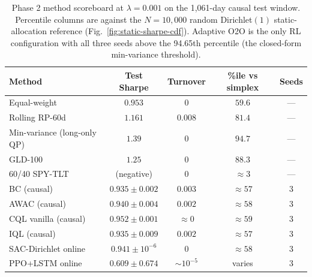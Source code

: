 \begin{table}[h]
\centering
\caption{Phase 2 method scoreboard at $\lambda{=}0.001$ on the 1{,}061-day causal test window. Percentile columns are against the $N{=}10{,}000$ random Dirichlet$(1)$ static-allocation reference (Fig.~\ref{fig:static-sharpe-cdf}). Adaptive O2O is the only RL configuration with all three seeds above the 94.65th percentile (the closed-form min-variance threshold).}
\label{tab:scoreboard}
\small
\begin{tabular}{lcccc}
\toprule
Method & Test Sharpe & Turnover & \%ile vs simplex & Seeds \\
\midrule
Equal-weight                  & $0.953$                    & $0$                                   & $59.6$                       & ---           \\
Rolling RP-60d                & $1.161$                    & $0.008$                               & $81.4$                       & ---           \\
Min-variance (long-only QP)   & $1.39$                     & $0$                                   & $94.7$                       & ---           \\
GLD-100                       & $1.25$                     & $0$                                   & $88.3$                       & ---           \\
60/40 SPY-TLT                 & (negative)                 & $0$                                   & $\approx 3$                  & ---           \\
\midrule
BC (causal)                   & $0.935 \pm 0.002$          & $0.003$                               & $\approx 57$                 & 3             \\
AWAC (causal)                 & $0.940 \pm 0.004$          & $0.002$                               & $\approx 58$                 & 3             \\
CQL vanilla (causal)          & $0.952 \pm 0.001$          & $\approx 0$                           & $\approx 59$                 & 3             \\
IQL (causal)                  & $0.935 \pm 0.009$          & $0.002$                               & $\approx 57$                 & 3             \\
\midrule
SAC-Dirichlet online          & $0.941 \pm 10^{-6}$        & $0$                                   & $\approx 58$                 & 3             \\
PPO+LSTM online               & $0.609 \pm 0.674$          & $\sim 10^{-5}$                        & varies                       & 3             \\

\end{tabular}
\end{table}
